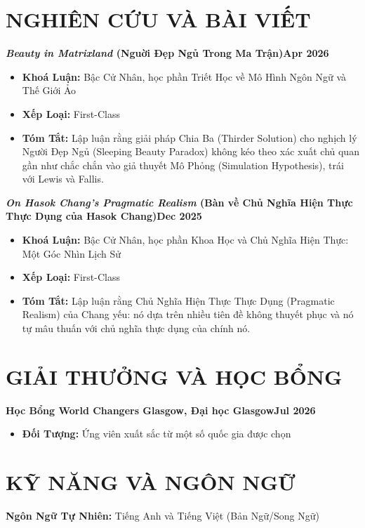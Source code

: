 \documentclass[a4paper,9pt]{extarticle}
\newcommand{\cventry}[2]{\noindent\textbf{#1}\hfill\textbf{#2}\par}
\begin{document}
    \vspace{1em}
\section*{NGHIÊN CỨU VÀ BÀI VIẾT}
    \cventry{\textit{Beauty in Matrixland} (Nguời Đẹp Ngủ Trong Ma Trận)}{Apr 2026}
    \begin{itemize}
        \item \textbf{Khoá Luận:} Bậc Cử Nhân, học phần Triết Học về Mô Hình Ngôn Ngữ và Thế Giới Ảo
        \item \textbf{Xếp Loại:} First-Class
        \item \textbf{Tóm Tắt:} Lập luận rằng giải pháp Chia Ba (Thirder Solution) cho nghịch lý Người Đẹp Ngủ (Sleeping Beauty Paradox) không kéo theo xác xuất chủ quan gần như chắc chắn vào giả thuyết Mô Phỏng (Simulation Hypothesis), trái với Lewis và Fallis.
    \end{itemize}

    \vspace{1em}
    \cventry{\textit{On Hasok Chang's Pragmatic Realism} (Bàn về Chủ Nghĩa Hiện Thực Thực Dụng của Hasok Chang)}{Dec 2025}
    \begin{itemize}
        \item \textbf{Khoá Luận:} Bậc Cử Nhân, học phần Khoa Học và Chủ Nghĩa Hiện Thực: Một Góc Nhìn Lịch Sử
        \item \textbf{Xếp Loại:} First-Class
        \item \textbf{Tóm Tắt:} Lập luận rằng Chủ Nghĩa Hiện Thực Thực Dụng (Pragmatic Realism) của Chang yếu: nó dựa trên nhiều tiên đề không thuyết phục và nó tự mâu thuấn với chủ nghĩa thực dụng của chính nó.
    \end{itemize}

    \vspace{1em}
\section*{GIẢI THƯỞNG VÀ HỌC BỔNG}
    \cventry{Học Bổng World Changers Glasgow, Đại học Glasgow}{Jul 2026}
    \begin{itemize}
        \item \textbf{Đối Tượng:} Ứng viên xuất sắc từ một số quốc gia được chọn
    \end{itemize}

    \vspace{1em}
\section*{KỸ NĂNG VÀ NGÔN NGỮ}
\noindent
\textbf{Ngôn Ngữ Tự Nhiên:} Tiếng Anh và Tiếng Việt (Bản Ngữ/Song Ngữ)
\end{document}
